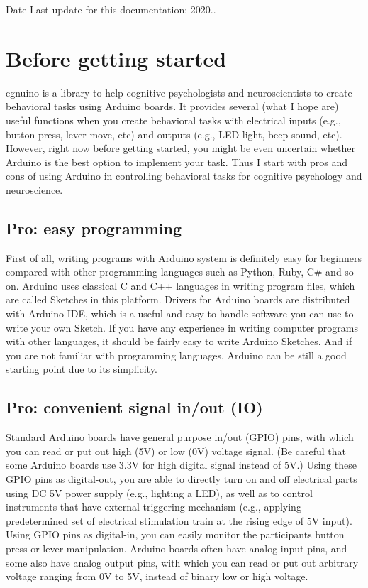\begin{DoxyDate}{Date}
Last update for this documentation\+: 2020..
\end{DoxyDate}
\hypertarget{index_s1}{}\section{Before getting started}\label{index_s1}
cgnuino is a library to help cognitive psychologists and neuroscientists to create behavioral tasks using Arduino boards. It provides several (what I hope are) useful functions when you create behavioral tasks with electrical inputs (e.\+g., button press, lever move, etc) and outputs (e.\+g., L\+ED light, beep sound, etc). However, right now before getting started, you might be even uncertain whether Arduino is the best option to implement your task. Thus I start with pros and cons of using Arduino in controlling behavioral tasks for cognitive psychology and neuroscience.\hypertarget{index_s1ss1}{}\subsection{Pro\+: easy programming}\label{index_s1ss1}
First of all, writing programs with Arduino system is definitely easy for beginners compared with other programming languages such as Python, Ruby, C\# and so on. Arduino uses classical C and C++ languages in writing program files, which are called Sketches in this platform. Drivers for Arduino boards are distributed with Arduino I\+DE, which is a useful and easy-\/to-\/handle software you can use to write your own Sketch. If you have any experience in writing computer programs with other languages, it should be fairly easy to write Arduino Sketches. And if you are not familiar with programming languages, Arduino can be still a good starting point due to its simplicity.\hypertarget{index_s1ss2}{}\subsection{Pro\+: convenient signal in/out (\+I\+O)}\label{index_s1ss2}
Standard Arduino boards have general purpose in/out (G\+P\+IO) pins, with which you can read or put out high (5V) or low (0V) voltage signal. (Be careful that some Arduino boards use 3.\+3V for high digital signal instead of 5V.) Using these G\+P\+IO pins as digital-\/out, you are able to directly turn on and off electrical parts using DC 5V power supply (e.\+g., lighting a L\+ED), as well as to control instruments that have external triggering mechanism (e.\+g., applying predetermined set of electrical stimulation train at the rising edge of 5V input). Using G\+P\+IO pins as digital-\/in, you can easily monitor the participant\textquotesingle{}s button press or lever manipulation. Arduino boards often have analog input pins, and some also have analog output pins, with which you can read or put out arbitrary voltage ranging from 0V to 5V, instead of binary low or high voltage.

